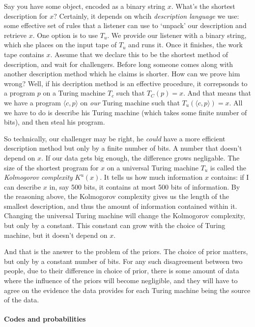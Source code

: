 Say you have some object, encoded as a binary string $x$. What's the shortest description for $x$? Certainly, it depends on whcih \emph{description language} we use: some effective set of rules that a listener can use to `unpack' our description and retrieve $x$. One option is to use $T_u$. We provide our listener with a binary string, which she places on the input tape of $T_u$ and runs it. Once it finishes, the work tape contains $x$. Assume that we declare this to be the shortest method of description, and wait for challengers. Before long someone comes along with another description method which he claims is shorter. How can we prove him wrong? Well, if his decription method is an effective procedure, it correpsonds to a program $p$ on a Turing machine $T_c$ such that $T_C(p) = x$. And that means that we have a program $\langle c, p\rangle$ on \emph{our} Turing machine such that $T_u(\langle c, p\rangle) = x$. All we have to do is describe his Turing machine (which takes some finite number of bits), and then steal his program.

So technically, our challenger may be right, he \emph{could} have a more efficient description method but only by a finite number of bits. A number that doesn't depend on $x$. If our data gets big enough, the difference grows negligable. The size of the shortest program for $x$ on a universal Turing machine $T_u$ is called the \emph{Kolmogorov complexity} $K^u(x)$. It tells us how much information $x$ contains: if I can describe $x$ in, say 500 bits, it contains at most 500 bits of information. By the reasoning above, the Kolmogorov complexity gives us the length of the smallest description, and thus the amount of information contained within it. Changing the universal Turing machine will change the Kolmogorov complexity, but only by a constant. This constant can grow with the choice of Turing machine, but it doesn't depend on $x$. 

And that is the answer to the problem of the priors. The choice of prior matters, but only by a constant number of bits. For any such disagreement between two people, due to their difference in choice of prior, there is some amount of data where the influence of the priors will become negligible, and they will have to agree on the evidence the data provides for each Turing machine being the source of the data. 

\paragraph{Codes and probabilities}


